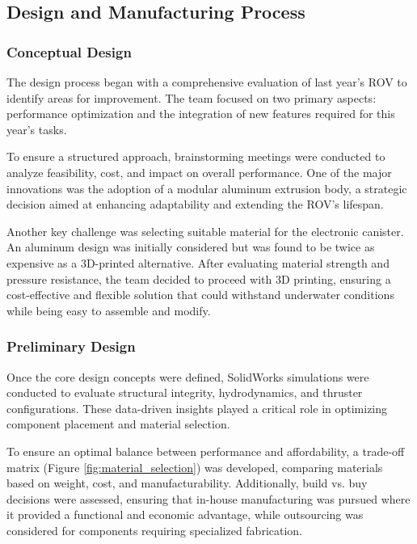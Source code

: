 \subsection{Design and Manufacturing Process}

\subsubsection{Conceptual Design}

The design process began with a comprehensive evaluation of last year’s ROV to identify areas for improvement. The team focused on two primary aspects: performance optimization and the integration of new features required for this year’s tasks.

\hspace{10pt} To ensure a structured approach, brainstorming meetings were conducted to analyze feasibility, cost, and impact on overall performance. One of the major innovations was the adoption of a modular aluminum extrusion body, a strategic decision aimed at enhancing adaptability and extending the ROV’s lifespan. 

\hspace{10pt} Another key challenge was selecting suitable material for the electronic canister. An aluminum design was initially considered but was found to be twice as expensive as a 3D-printed alternative. After evaluating material strength and pressure resistance, the team decided to proceed with 3D printing, ensuring a cost-effective and flexible solution that could withstand underwater conditions while being easy to assemble and modify.

\subsubsection{Preliminary Design}

Once the core design concepts were defined, SolidWorks simulations were conducted to evaluate structural integrity, hydrodynamics, and thruster configurations. These data-driven insights played a critical role in optimizing component placement and material selection.

\hspace{10pt} To ensure an optimal balance between performance and affordability, a trade-off matrix (Figure \ref{fig:material_selection}) was developed, comparing materials based on weight, cost, and manufacturability. Additionally, build vs. buy decisions were assessed, ensuring that in-house manufacturing was pursued where it provided a functional and economic advantage, while outsourcing was considered for components requiring specialized fabrication.

